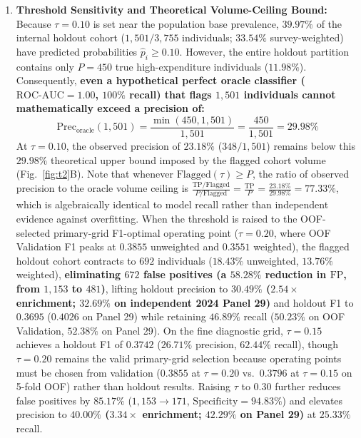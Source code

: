 \documentclass[runningheads]{llncs}
\begin{document}
\begin{enumerate}
    \item \textbf{Threshold Sensitivity and Theoretical Volume-Ceiling Bound:} Because $\tau = 0.10$ is set near the population base prevalence, $39.97\%$ of the internal holdout cohort ($1,501 / 3,755$ individuals; $33.54\%$ survey-weighted) have predicted probabilities $\hat{p}_i \ge 0.10$. However, the entire holdout partition contains only $P = 450$ true high-expenditure individuals ($11.98\%$). Consequently, \textbf{even a hypothetical perfect oracle classifier ($\text{ROC-AUC} = 1.00$, $100\%$ recall) that flags $1,501$ individuals cannot mathematically exceed a precision of:}
    \begin{equation}
    \text{Prec}_{\text{oracle}}(1{,}501) = \frac{\min(450, 1{,}501)}{1{,}501} = \frac{450}{1{,}501} = 29.98\%
    \end{equation}
    At $\tau = 0.10$, the observed precision of $23.18\%$ ($348 / 1,501$) remains below this $29.98\%$ theoretical upper bound imposed by the flagged cohort volume (Fig.~\ref{fig:t2}B). Note that whenever $\text{Flagged}(\tau) \ge P$, the ratio of observed precision to the oracle volume ceiling is $\frac{\text{TP}/\text{Flagged}}{P/\text{Flagged}} = \frac{\text{TP}}{P} = \frac{23.18\%}{29.98\%} = 77.33\%$, which is algebraically identical to model recall rather than independent evidence against overfitting. When the threshold is raised to the OOF-selected primary-grid F1-optimal operating point ($\tau = 0.20$, where OOF Validation F1 peaks at $0.3855$ unweighted and $0.3551$ weighted), the flagged holdout cohort contracts to $692$ individuals ($18.43\%$ unweighted, $13.76\%$ weighted), \textbf{eliminating $672$ false positives (a $58.28\%$ reduction in $\text{FP}$, from $1,153$ to $481$)}, lifting holdout precision to \textbf{$30.49\%$ ($2.54\times$ enrichment; $32.69\%$ on independent 2024 Panel 29)} and holdout F1 to \textbf{$0.3695$} ($0.4026$ on Panel 29) while retaining $46.89\%$ recall ($50.23\%$ on OOF Validation, $52.38\%$ on Panel 29). On the fine diagnostic grid, $\tau = 0.15$ achieves a holdout F1 of \textbf{$0.3742$} ($26.71\%$ precision, $62.44\%$ recall), though $\tau = 0.20$ remains the valid primary-grid selection because operating points must be chosen from validation ($0.3855$ at $\tau=0.20$ vs.\ $0.3796$ at $\tau=0.15$ on 5-fold OOF) rather than holdout results. Raising $\tau$ to $0.30$ further reduces false positives by \textbf{$85.17\%$} ($1,153 \to 171$, $\text{Specificity} = 94.83\%$) and elevates precision to \textbf{$40.00\%$ ($3.34\times$ enrichment; $42.29\%$ on Panel 29)} at $25.33\%$ recall.

\end{enumerate}
\end{document}
